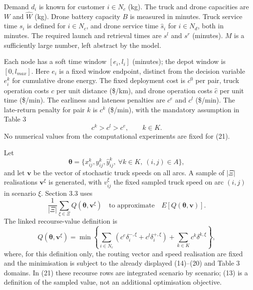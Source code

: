 \documentclass[10pt]{article}
\begin{document}
Demand $d_i$ is known for customer $i\in N_c$ (kg). The truck and drone capacities are $W$ and $\hat W$ (kg). Drone battery capacity $B$ is measured in minutes. Truck service time $s_i$ is defined for $i\in N_c$, and drone service time $\hat s_i$ for $i\in N_d$, both in minutes. The required launch and retrieval times are $s^l$ and $s^r$ (minutes). $M$ is a sufficiently large number, left abstract by the model.

Each node has a soft time window $[e_i,l_i]$ (minutes); the depot window is $[0,l_{max}]$. Here $e_i$ is a fixed window endpoint, distinct from the decision variable $e_i^k$ for cumulative drone energy. The fixed deployment cost is $c^0$ per pair, truck operation costs $c$ per unit distance (\$/km), and drone operation costs $\hat c$ per unit time (\$/min). The earliness and lateness penalties are $c^e$ and $c^l$ (\$/min). The late-return penalty for pair $k$ is $c^k$ (\$/min), with the mandatory assumption in Table 3
\[
c^k>c^l>c^e,\qquad k\in K.
\]
No numerical values from the computational experiments are fixed for (21).

Let
\[
\boldsymbol\theta=\{x_{ij}^k,y_{ij}^k,\hat y_{ij}^k,\ \forall k\in K,\ (i,j)\in A\},
\]
and let $\mathbf v$ be the vector of stochastic truck speeds on all arcs. A sample of $|\Xi|$ realisations $\mathbf v^\xi$ is generated, with $v_{ij}^\xi$ the fixed sampled truck speed on arc $(i,j)$ in scenario $\xi$. Section 3.3 uses
\[
\frac{1}{|\Xi|}\sum_{\xi\in\Xi}Q(\boldsymbol\theta,\mathbf v^\xi)
\quad\text{to approximate}\quad E[Q(\boldsymbol\theta,\mathbf v)].
\]
The linked recourse-value definition is
\begin{equation}
Q(\boldsymbol\theta,\mathbf v^\xi)
=\min\left\{\sum_{i\in N_c}(c^e\delta_i^{-,\xi}+c^l\delta_i^{+,\xi})+\sum_{k\in K}c^k\delta^{k,\xi}\right\},\tag{13}
\end{equation}
where, for this definition only, the routing vector and speed realisation are fixed and the minimisation is subject to the already displayed (14)--(20) and Table 3 domains. In (21) these recourse rows are integrated scenario by scenario; (13) is a definition of the sampled value, not an additional optimisation objective.
\end{document}
